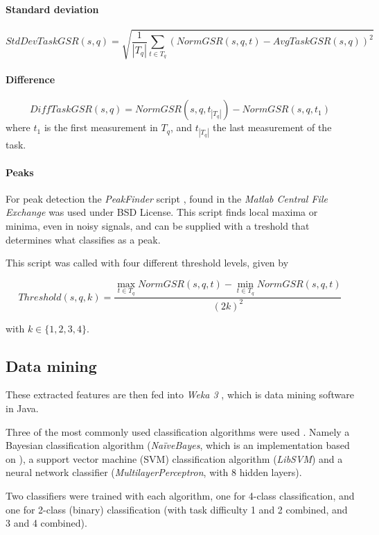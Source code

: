 \documentclass[11pt,leqno,a4paper]{report} %
\begin{document}
\paragraph{Standard deviation}

\[
StdDevTaskGSR(s,q) = \sqrt {\frac{1}{\left\vert{T_q}\right\vert}   \sum_{t \in T_q} (NormGSR(s,q,t) - AvgTaskGSR(s,q))^2 }
\]

\paragraph{Difference}

\[
DiffTaskGSR(s,q) = NormGSR(s,q, t_{\left\vert{T_q}\right\vert}) - NormGSR(s,q, t_1)
\]
where $t_1$ is the first measurement in $T_q$, and $t_{\left\vert{T_q}\right\vert}$ the last measurement of the task.

\paragraph{Peaks}
For peak detection the \emph{PeakFinder} script \citep{yoder}, found in the \emph{Matlab Central File Exchange} was used under BSD License. This script finds local maxima or minima, even in noisy signals, and can be supplied with a treshold that determines what classifies as a peak.

This script was called with four different threshold levels, given by

\[
Threshold(s,q,k) = \frac 
{\max_{t \in T_q} NormGSR(s,q,t) - \min_{t \in T_q} NormGSR(s,q,t)} 
{(2k)^2}
\]

with $k \in \{1,2,3,4\}$.


\subsection{Data mining}

These extracted features are then fed into \emph{Weka 3} \citep{weka}, which is data mining software in Java. 


Three of the most commonly used classification algorithms were used \citep{small}. Namely a Bayesian classification algorithm (\emph{Na\"iveBayes}, which is an implementation based on \citep{john1995estimating}), a support vector machine (SVM) classification algorithm (\emph{LibSVM}) \citep{libsvm} and a neural network classifier (\emph{MultilayerPerceptron}, with 8 hidden layers). 

Two classifiers  were trained with each algorithm, one for 4-class classification, and one for 2-class (binary) classification (with task difficulty 1 and 2 combined, and 3 and 4 combined).
\end{document}
